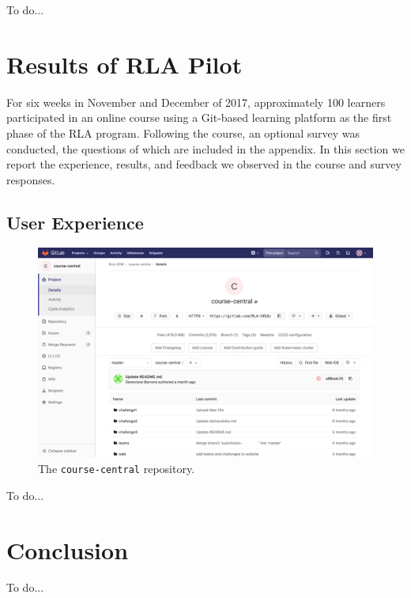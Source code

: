 \documentclass[12pt,twoside,vi]{mitthesis}
\newcommand{\wip}[1]{{\color{red} To do...}}
\begin{document}
\wip{more details}


\chapter{Results of RLA Pilot}

For six weeks in November and December of 2017, approximately 100 learners participated in an online course using a Git-based learning platform as the first phase of the RLA program. Following the course, an optional survey was conducted, the questions of which are included in the appendix. In this section we report the experience, results, and feedback we observed in the course and survey responses.

\section{User Experience}

\begin{figure}[H]
\centering
\includegraphics[scale=0.3]{fig-course-central.png}
\caption{The \texttt{course-central} repository.}
\end{figure}

\wip{Frame around tensions, for each broad set of interactions go over "what did it look like", "how did it work", and "how well did it work"}

\chapter{Conclusion}

\wip{narrative summary of thesis, an honest set of personal takeaways (from which reader can judge whether to replicate work) and feeligns about future work}
\end{document}
